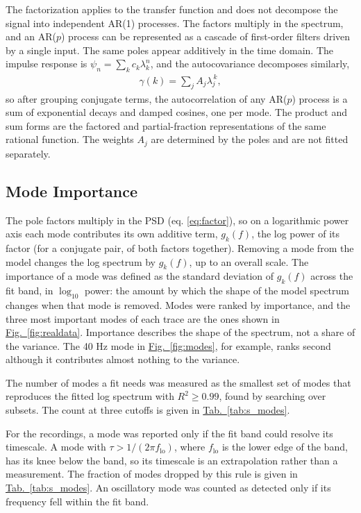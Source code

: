 \documentclass[pdflatex,lineno,sn-nature]{sn-jnl}
\newcommand{\figpanel}[3][]{\hyperref[#2]{Fig.~#1\ref*{#2}#3}}
\newcommand{\tabpanel}[2][]{\hyperref[#2]{Tab.~#1\ref*{#2}}}
\theoremstyle{thmstyleone}
\theoremstyle{thmstyletwo}
\theoremstyle{thmstylethree}
\begin{document}
The factorization applies to the transfer function and does not decompose the signal into independent AR(1) processes. The factors multiply in the spectrum, and an AR($p$) process can be represented as a cascade of first-order filters driven by a single input. The same poles appear additively in the time domain. The impulse response is $\psi_n = \sum_k c_k \lambda_k^n$, and the autocovariance decomposes similarly,
\begin{align}
\gamma(k) = \sum_j A_j \lambda_j^{\,k}, \label{eq:acfmodes}
\end{align}
so after grouping conjugate terms, the autocorrelation of any AR($p$) process is a sum of exponential decays and damped cosines, one per mode. The product and sum forms are the factored and partial-fraction representations of the same rational function. The weights $A_j$ are determined by the poles and are not fitted separately.

\subsection{Mode Importance}

The pole factors multiply in the PSD (eq. \ref{eq:factor}), so on a logarithmic power axis each mode contributes its own additive term, $g_k(f)$, the log power of its factor (for a conjugate pair, of both factors together). Removing a mode from the model changes the log spectrum by $g_k(f)$, up to an overall scale. The importance of a mode was defined as the standard deviation of $g_k(f)$ across the fit band, in $\log_{10}$ power: the amount by which the shape of the model spectrum changes when that mode is removed. Modes were ranked by importance, and the three most important modes of each trace are the ones shown in \figpanel{fig:realdata}{}. Importance describes the shape of the spectrum, not a share of the variance. The 40 Hz mode in \figpanel{fig:modes}{}, for example, ranks second although it contributes almost nothing to the variance.

The number of modes a fit needs was measured as the smallest set of modes that reproduces the fitted log spectrum with $R^2 \geq 0.99$, found by searching over subsets. The count at three cutoffs is given in \tabpanel{tab:s_modes}.

For the recordings, a mode was reported only if the fit band could resolve its timescale. A mode with $\tau > 1/(2\pi f_{\mathrm{lo}})$, where $f_{\mathrm{lo}}$ is the lower edge of the band, has its knee below the band, so its timescale is an extrapolation rather than a measurement. The fraction of modes dropped by this rule is given in \tabpanel{tab:s_modes}. An oscillatory mode was counted as detected only if its frequency fell within the fit band.
\end{document}
